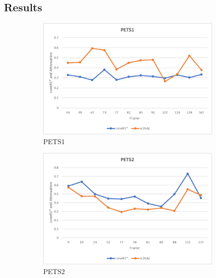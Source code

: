 \begin{appendices}
\chapter{Results}
\clearpage
\FloatBarrier
\begin{figure}
  \begin{subfigure}{.45\linewidth}
  \includegraphics[width=1\linewidth]{figures/appendix/pets1_rgb.jpg}
  \caption{PETS1}
\end{subfigure}
\hfill
\begin{subfigure}{.45\linewidth}
  \includegraphics[width=1\linewidth]{figures/appendix/pets2_rgb.jpg}
  \caption{PETS2}
\end{subfigure}
\hfill
\begin{subfigure}{.45\linewidth}

\end{subfigure}
\end{figure}
\end{appendices}
